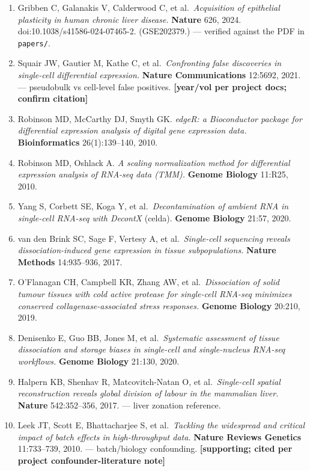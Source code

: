 \documentclass[11pt,a4paper]{article}
\begin{document}
\begin{enumerate}[leftmargin=1.6em]
  \item Gribben C, Galanakis V, Calderwood C, et al.\ \emph{Acquisition of epithelial plasticity in human chronic liver disease.} \textbf{Nature} 626, 2024. doi:10.1038/s41586-024-07465-2. (GSE202379.) --- verified against the PDF in \texttt{papers/}.
  \item Squair JW, Gautier M, Kathe C, et al.\ \emph{Confronting false discoveries in single-cell differential expression.} \textbf{Nature Communications} 12:5692, 2021. --- pseudobulk vs cell-level false positives. \textbf{[year/vol per project docs; confirm citation]}
  \item Robinson MD, McCarthy DJ, Smyth GK. \emph{edgeR: a Bioconductor package for differential expression analysis of digital gene expression data.} \textbf{Bioinformatics} 26(1):139--140, 2010.
  \item Robinson MD, Oshlack A. \emph{A scaling normalization method for differential expression analysis of RNA-seq data (TMM).} \textbf{Genome Biology} 11:R25, 2010.
  \item Yang S, Corbett SE, Koga Y, et al.\ \emph{Decontamination of ambient RNA in single-cell RNA-seq with DecontX} (celda). \textbf{Genome Biology} 21:57, 2020.
  \item van den Brink SC, Sage F, Vertesy A, et al.\ \emph{Single-cell sequencing reveals dissociation-induced gene expression in tissue subpopulations.} \textbf{Nature Methods} 14:935--936, 2017.
  \item O'Flanagan CH, Campbell KR, Zhang AW, et al.\ \emph{Dissociation of solid tumour tissues with cold active protease for single-cell RNA-seq minimizes conserved collagenase-associated stress responses.} \textbf{Genome Biology} 20:210, 2019.
  \item Denisenko E, Guo BB, Jones M, et al.\ \emph{Systematic assessment of tissue dissociation and storage biases in single-cell and single-nucleus RNA-seq workflows.} \textbf{Genome Biology} 21:130, 2020.
  \item Halpern KB, Shenhav R, Matcovitch-Natan O, et al.\ \emph{Single-cell spatial reconstruction reveals global division of labour in the mammalian liver.} \textbf{Nature} 542:352--356, 2017. --- liver zonation reference.
  \item Leek JT, Scott E, Bhattacharjee S, et al.\ \emph{Tackling the widespread and critical impact of batch effects in high-throughput data.} \textbf{Nature Reviews Genetics} 11:733--739, 2010. --- batch/biology confounding. \textbf{[supporting; cited per project confounder-literature note]}
\end{enumerate}
\end{document}

